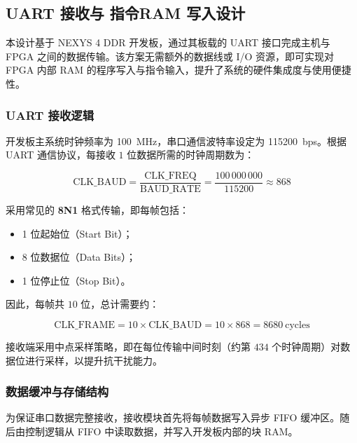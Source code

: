 \documentclass[lang=cn,a4paper,newtx]{elegantpaper}
\begin{document}


\subsection{UART 接收与 指令RAM 写入设计}

本设计基于 NEXYS 4 DDR 开发板，通过其板载的 UART 接口完成主机与 FPGA 之间的数据传输。该方案无需额外的数据线或 I/O 资源，即可实现对 FPGA 内部 RAM 的程序写入与指令输入，提升了系统的硬件集成度与使用便捷性。

\subsubsection{UART 接收逻辑}

开发板主系统时钟频率为 \SI{100}{\mega\hertz}，串口通信波特率设定为 \SI{115200}{bps}。根据 UART 通信协议，每接收 $1$ 位数据所需的时钟周期数为：

\begin{equation}
  \text{CLK\_BAUD} = \frac{\text{CLK\_FREQ}}{\text{BAUD\_RATE}} = \frac{100\,000\,000}{115200} \approx 868
\end{equation}

采用常见的 \textbf{8N1} 格式传输，即每帧包括：

\begin{itemize}
  \item 1 位起始位（Start Bit）；
  \item 8 位数据位（Data Bits）；
  \item 1 位停止位（Stop Bit）。
\end{itemize}

因此，每帧共 $10$ 位，总计需要约：

\begin{equation}
  \text{CLK\_FRAME} = 10 \times \text{CLK\_BAUD} = 10 \times 868 = 8680\ \text{cycles}
\end{equation}

接收端采用中点采样策略，即在每位传输中间时刻（约第 $434$ 个时钟周期）对数据位进行采样，以提升抗干扰能力。

\subsubsection{数据缓冲与存储结构}

为保证串口数据完整接收，接收模块首先将每帧数据写入异步 FIFO 缓冲区。随后由控制逻辑从 FIFO 中读取数据，并写入开发板内部的块 RAM。
\end{document}
